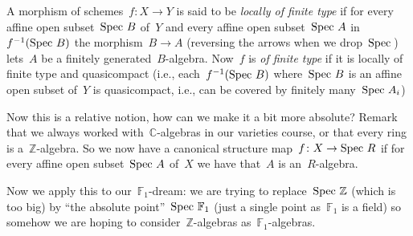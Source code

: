 \begin{definition}
  A morphism of schemes~$f\colon X\to Y$ is said to be \emph{locally of finite type} if for every affine open subset~$\operatorname{Spec\,} B$ of~$Y$ and every affine open subset~$\operatorname{Spec\,} A$ in~$f^{-1}(\operatorname{Spec\,} B)$ the morphism~$B\to A$ (reversing the arrows when we drop~$\operatorname{Spec\,}$) lets~$A$ be a finitely generated~$B$-algebra. Now~$f$ is \emph{of finite type} if it is locally of finite type and quasicompact (i.e., each~$f^{-1}(\operatorname{Spec\,} B)$ where~$\operatorname{Spec\,} B$ is an affine open subset of~$Y$ is quasicompact, i.e., can be covered by finitely many~$\operatorname{Spec\,} A_i$)
\end{definition}

Now this is a relative notion, how can we make it a bit more absolute? Remark that we always worked with~$\mathbb{C}$\nobreakdash-algebras in our varieties course, or that every ring is a~$\mathbb{Z}$\nobreakdash-algebra. So we now have a canonical structure map~$f\colon X\to\operatorname{Spec\,} R$ if for every affine open subset~$\operatorname{Spec\,} A$ of~$X$ we have that~$A$ is an~$R$\nobreakdash-algebra.

Now we apply this to our~$\mathbb{F}_1$\nobreakdash-dream: we are trying to replace~$\operatorname{Spec\,}\mathbb{Z}$ (which is too big) by ``the absolute point''~$\operatorname{Spec\,}\mathbb{F}_1$ (just a single point as~$\mathbb{F}_1$ is a field) so somehow we are hoping to consider~$\mathbb{Z}$\nobreakdash-algebras as~$\mathbb{F}_1$\nobreakdash-algebras.
